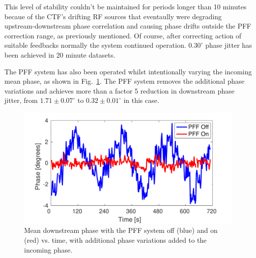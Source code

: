 \documentclass[%
 reprint,
superscriptaddress,
 amsmath,amssymb,
 prl,
]{revtex4-1}
\begin{document}
This level of stability couldn't be maintained for periods longer than 10 minutes 
becaue of the CTF's drifting RF sources 
that eventaully were degrading upstream-downstream phase 
correlation and causing phase drifts outside the PFF correction range, as previously 
mentioned. Of course, after correcting action of suitable feedbacks normally the system
continued operation. \(0.30^\circ\) phase jitter has been achieved in 20 minute datasets. 


The PFF system has also been operated 
whilst intentionally varying the incoming mean phase, as shown in 
Fig.~\ref{fig:wiggle}. The PFF system removes the additional phase variations 
and achieves more than a factor 5 reduction in downstream phase jitter, from 
\(1.71\pm0.07^\circ\) to \(0.32\pm0.01^\circ\) in this case.

\begin{figure}
	\includegraphics[width=\columnwidth]{figs/wiggle}
	\caption{\label{fig:wiggle}Mean downstream phase with the PFF system off 
		(blue) and on (red) vs. time, with additional phase variations added to 
		the 
		incoming phase.}
\end{figure}

%
%
%
\end{document}
